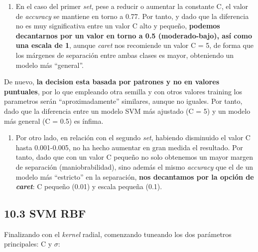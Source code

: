 \documentclass[
]{article}
\providecommand{\tightlist}{%
  \setlength{\itemsep}{0pt}\setlength{\parskip}{0pt}}
\begin{document}
\begin{enumerate}
\def\labelenumi{\arabic{enumi}.}
\tightlist
\item
  En el caso del primer \emph{set}, pese a reducir o aumentar la
  constante C, el valor de \emph{accuracy} se mantiene en torno a 0.77.
  Por tanto, y dado que la diferencia no es muy significativa entre un
  valor C alto y pequeño, \textbf{podemos decantarnos por un valor en
  torno a 0.5 (moderado-bajo), así como una escala de 1}, aunque
  \emph{caret} nos recomiende un valor C = 5, de forma que los márgenes
  de separación entre ambas clases es mayor, obteniendo un modelo más
  ``general''.
\end{enumerate}

De nuevo, \textbf{la decision esta basada por patrones y no en valores
puntuales}, por lo que empleando otra semilla y con otros valores
training los parametros serán ``aproximadamente'' similares, aunque no
iguales. Por tanto, dado que la diferencia entre un modelo SVM más
ajustado (C = 5) y un modelo más general (C = 0.5) es ínfima.

\begin{enumerate}
\def\labelenumi{\arabic{enumi}.}
\setcounter{enumi}{1}
\tightlist
\item
  Por otro lado, en relación con el segundo \emph{set}, habiendo
  disminuido el valor C hasta 0.001-0.005, no ha hecho aumentar en gran
  medida el resultado. Por tanto, dado que con un valor C pequeño no
  solo obtenemos un mayor margen de separación (maniobrabilidad), sino
  además el mismo \emph{accuracy} que el de un modelo más ``estricto''
  en la separación, \textbf{nos decantamos por la opción de
  \emph{caret}}: C pequeño (0.01) y escala pequeña (0.1).
\end{enumerate}

\hypertarget{svm-rbf}{%
\subsection{10.3 SVM RBF}\label{svm-rbf}}

Finalizando con el \emph{kernel} radial, comenzando tuneando los dos
parámetros principales: C y \(\sigma\):
\end{document}
